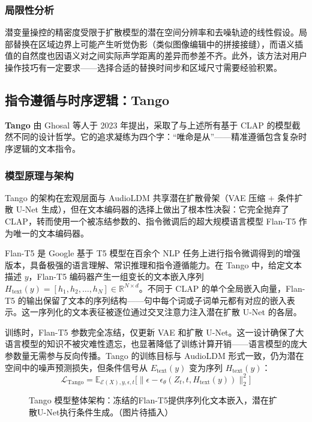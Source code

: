 \documentclass[12pt,a4paper]{article}
\begin{document}
\subsubsection{局限性分析}
潜变量操控的精密度受限于扩散模型的潜在空间分辨率和去噪轨迹的线性假设。局部替换在区域边界上可能产生听觉伪影（类似图像编辑中的拼接接缝），而语义插值的自然度也因语义对之间实际声学距离的差异而参差不齐。此外，该方法对用户操作技巧有一定要求——选择合适的替换时间步和区域尺寸需要经验积累。

\subsection{指令遵循与时序逻辑：Tango}

\textbf{Tango} 由 Ghosal 等人于 2023 年提出，采取了与上述所有基于 CLAP 的模型截然不同的设计哲学。它的追求凝练为四个字：“唯命是从”——精准遵循包含复杂时序逻辑的文本指令。

\subsubsection{模型原理与架构}
Tango 的架构在宏观层面与 AudioLDM 共享潜在扩散骨架（VAE 压缩 + 条件扩散 U-Net 生成），但在文本编码器的选择上做出了根本性决裂：它完全抛弃了 CLAP，转而使用一个被冻结参数的、指令微调后的超大规模语言模型 Flan-T5 作为唯一的文本编码器。

Flan-T5 是 Google 基于 T5 模型在百余个 NLP 任务上进行指令微调得到的增强版本，具备极强的语言理解、常识推理和指令遵循能力。在 Tango 中，给定文本描述 \(y\)，Flan-T5 编码器产生一组变长的文本嵌入序列 \(H_{\text{text}}(y) = [h_1, h_2, \dots, h_N] \in \mathbb{R}^{N \times d}\)。不同于 CLAP 的单个全局嵌入向量，Flan-T5 的输出保留了文本的序列结构——句中每个词或子词单元都有对应的嵌入表示。这一序列化的文本表征被逐位通过交叉注意力注入潜在扩散 U-Net 的各层。

训练时，Flan-T5 参数完全冻结，仅更新 VAE 和扩散 U-Net。这一设计确保了大语言模型的知识不被灾难性遗忘，也显著降低了训练计算开销——语言模型的庞大参数量无需参与反向传播。Tango 的训练目标与 AudioLDM 形式一致，仍为潜在空间中的噪声预测损失，但条件信号从 \(E_{\text{text}}(y)\) 变为序列 \(H_{\text{text}}(y)\)：
\begin{equation}
\mathcal{L}_{\text{Tango}} = \mathbb{E}_{\mathcal{E}(X), y, \epsilon, t} \big[ \| \epsilon - \epsilon_\theta(Z_t, t, H_{\text{text}}(y)) \|_2^2 \big]
\end{equation}

\begin{figure}[htbp]
\centering
{}
\caption{Tango 模型整体架构：冻结的Flan-T5提供序列化文本嵌入，潜在扩散U-Net执行条件生成。（图片待插入）}
\label{fig:tango}
\end{figure}
\end{document}
